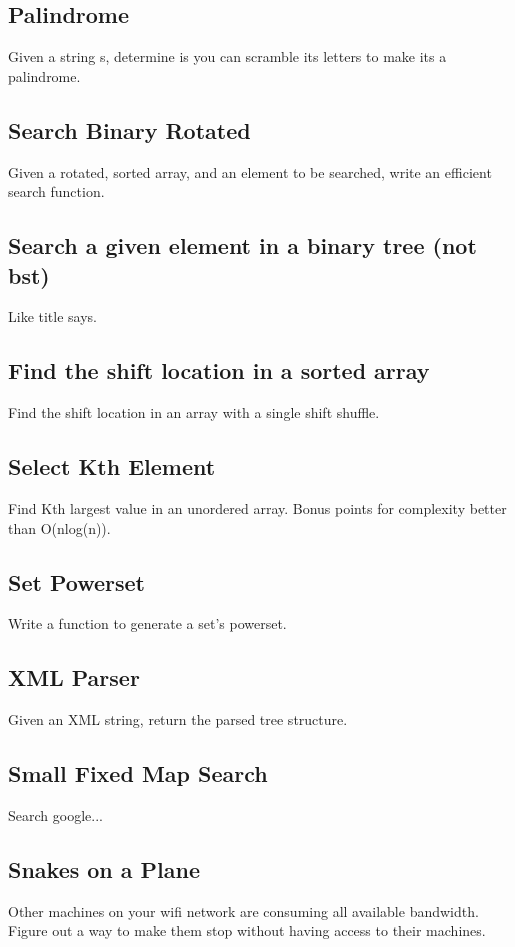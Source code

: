 \documentclass{llncs}
\begin{document}
\subsection{Palindrome}
Given a string s, determine is you can scramble its letters to make its a palindrome.

\subsection{Search Binary Rotated}
Given a rotated, sorted array, and an element to be searched, write an efficient search function.

\subsection{Search a given element in a binary tree (not bst)}
Like title says.

\subsection{Find the shift location in a sorted array}
Find the shift location in an array with a single shift shuffle.

\subsection{Select Kth Element}
Find Kth largest value in an unordered array. Bonus points for complexity better than O(nlog(n)).

\subsection{Set Powerset}
Write a function to generate a set's powerset.

\subsection{XML Parser}
Given an XML string, return the parsed tree structure.

\subsection{Small Fixed Map Search}
Search google...

\subsection{Snakes on a Plane}
Other machines on your wifi network are consuming all available bandwidth. Figure out a way to make them stop without having access to their machines.
\end{document}
